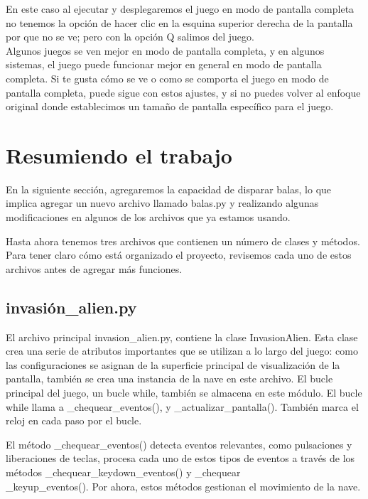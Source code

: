 En este caso al ejecutar y desplegaremos el juego en modo de pantalla completa no tenemos la opción de hacer clic en la esquina superior derecha de la pantalla por que no se ve; pero con la  opción  {\ttfamily Q} salimos del juego.\\


Algunos juegos se ven mejor en modo de pantalla completa, y en algunos sistemas, el juego puede funcionar mejor en general en
modo de pantalla completa. Si te gusta cómo se ve o como se comporta el juego en modo de pantalla completa, puede sigue
con estos ajustes, y si no puedes volver al enfoque original donde establecimos un tamaño de pantalla específico para
el juego.


\section{Resumiendo el trabajo}

En la siguiente sección, agregaremos la capacidad de disparar balas, lo que implica agregar un nuevo archivo llamado {\ttfamily balas.py} y realizando algunas modificaciones en algunos de los archivos que ya estamos usando. 

Hasta ahora tenemos tres archivos que contienen un número de clases y métodos. Para tener claro cómo está organizado el proyecto,
revisemos cada uno de estos archivos antes de agregar más funciones.


\subsection{invasión\_alien.py}

El archivo principal {\ttfamily invasion\_alien.py}, contiene la clase  {\ttfamily InvasionAlien}. Esta clase crea una 
serie de atributos importantes que se utilizan a lo largo del juego: como las configuraciones se asignan
de la superficie principal de visualización de la pantalla, también se crea una instancia de la nave en este archivo. 
El bucle principal del juego, un bucle while, también se almacena en este módulo. El bucle while llama 
a {\ttfamily \_chequear\_eventos()},  y {\ttfamily \_actualizar\_pantalla()}. También marca el reloj en cada paso por el bucle.

El método {\ttfamily \_chequear\_eventos()} detecta eventos relevantes, como pulsaciones y liberaciones de teclas,  procesa cada uno de estos tipos de eventos a través de los métodos  { }{\ttfamily \_chequear\_keydown\_eventos()} { } y  { } {\ttfamily \_chequear\\\_keyup\_eventos()}. Por ahora, estos métodos gestionan el movimiento de la nave. 

